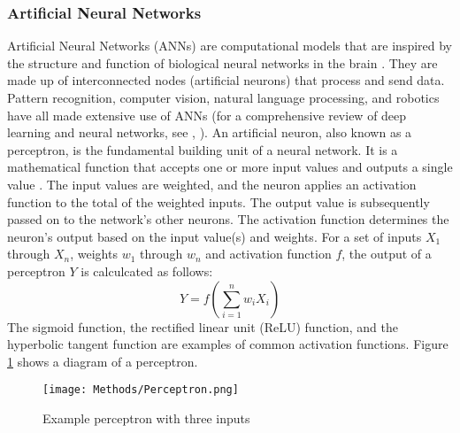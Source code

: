   \subsubsection{Artificial Neural Networks}
    Artificial Neural Networks (ANNs) are computational models that are inspired by the structure and function of biological neural networks in the brain \cite{NN_foundation}.
    They are made up of interconnected nodes (artificial neurons) that process and send data. 
    Pattern recognition, computer vision, natural language processing, and robotics have all made extensive use of ANNs 
    (for a comprehensive review of deep learning and neural networks, see \cite{Deep_learning_overview}, \cite{Goodfellow}).
    An artificial neuron, also known as a perceptron, is the fundamental building unit of a neural network. It is a mathematical function that accepts one or more input values 
    and outputs a single value \cite{Perceptron}.
    The input values are weighted, and the neuron applies an activation function to the total of the weighted inputs. The output value is subsequently passed on to the network's 
    other neurons. The activation function determines the neuron's output based on the input value(s) and weights.
    For a set of inputs $X_1$ through $X_n$, weights $w_1$ through $w_n$ and activation function $f$, the output of a perceptron $Y$ is calculcated as follows:
    \begin{equation}
      Y = f(\sum_{i=1}^n w_iX_i)
    \end{equation}
    The sigmoid function, the rectified linear unit (ReLU) function, and the hyperbolic tangent function are examples of common activation functions.
    Figure \ref{fig:Perceptron} shows a diagram of a perceptron.

    \begin{figure}[H]
      \begin{center}
        \texttt{[image: Methods/Perceptron.png]}
      \end{center}
      \caption{Example perceptron with three inputs}
      \label{fig:Perceptron}
    \end{figure}

